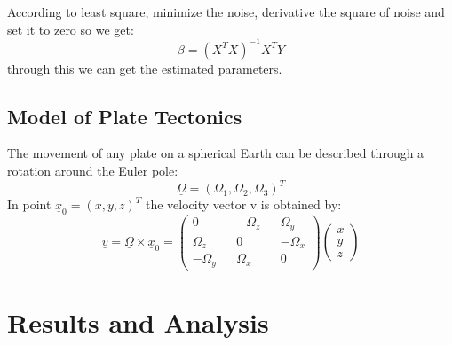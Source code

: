 \documentclass{article}
\begin{document}
According to least square, minimize the noise, 
derivative the square of noise and set it to zero so we get:
\vspace{6pt}
$$\beta=(X^TX)^{-1}X^TY$$ through this we can get the estimated parameters.

\subsection{Model of Plate Tectonics}
The movement of any plate on a spherical Earth can be described through a rotation around the Euler pole:
\vspace{5pt}
$$\underline{\Omega}=(\Omega_{1},\Omega_{2},\Omega_{3})^{T}$$
\vspace{5pt}
In point $\underline{x}_{0}=(x,y,z)^{T}$ the velocity vector v is obtained by:
\vspace{4pt}
$$\underline{v}=\underline{\Omega}\times\underline{x}_0=\begin{pmatrix}0&&-\Omega_z&&\Omega_y\\\Omega_z&&0&&-\Omega_x\\-\Omega_y&&\Omega_x&&0\end{pmatrix}\begin{pmatrix}x\\y\\z\end{pmatrix}$$


\section{Results and Analysis}
\end{document}
